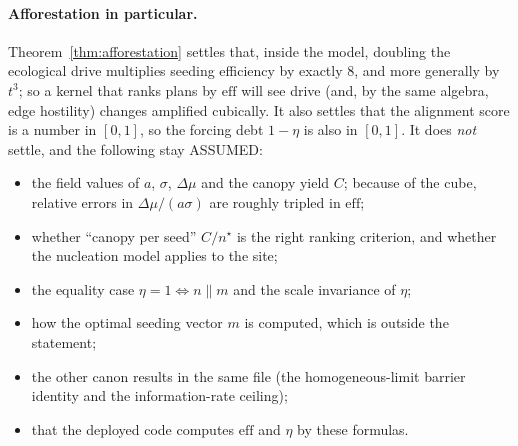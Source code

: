 \documentclass[11pt]{article}
\theoremstyle{definition}
\theoremstyle{remark}
\begin{document}
\paragraph{Afforestation in particular.} Theorem~\ref{thm:afforestation} settles that, inside the model,
doubling the ecological drive multiplies seeding efficiency by exactly $8$, and more generally by $t^3$; so a kernel that ranks
plans by $\mathrm{eff}$ will see drive (and, by the same algebra, edge hostility) changes amplified cubically. It also settles that
the alignment score is a number in $[0,1]$, so the forcing debt $1-\eta$ is also in $[0,1]$.
It does \emph{not} settle, and the following stay ASSUMED:
\begin{itemize}
\item the field values of $a$, $\sigma$, $\Delta\mu$ and the canopy yield $C$; because of the cube, relative errors in
$\Delta\mu/(a\sigma)$ are roughly tripled in $\mathrm{eff}$;
\item whether ``canopy per seed'' $C/n^\star$ is the right ranking criterion, and whether the nucleation model applies to the site;
\item the equality case $\eta=1\iff n\parallel m$ and the scale invariance of $\eta$;
\item how the optimal seeding vector $m$ is computed, which is outside the statement;
\item the other canon results in the same file (the homogeneous-limit barrier identity and the information-rate ceiling);
\item that the deployed code computes $\mathrm{eff}$ and $\eta$ by these formulas.
\end{itemize}
\end{document}
